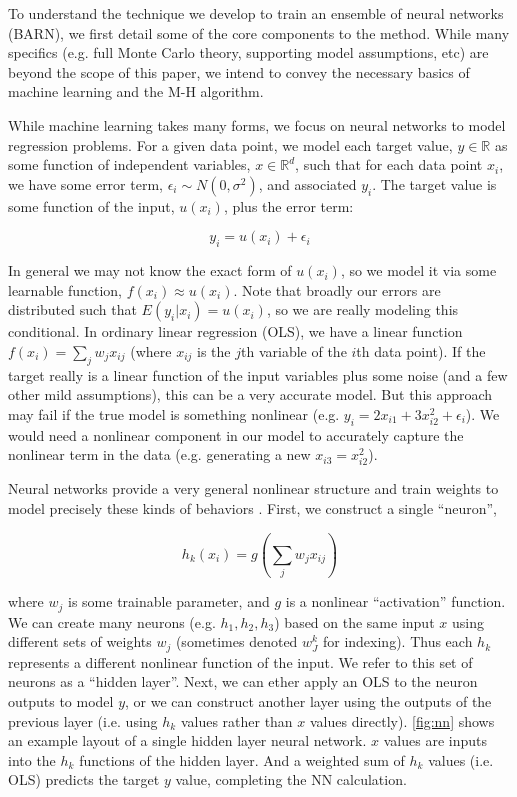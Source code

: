 \documentclass[12pt]{article}
\begin{document}

To understand the technique we develop to train an ensemble of neural networks (BARN), we first detail some of the core components to the method.  While many specifics (e.g. full Monte Carlo theory, supporting model assumptions, etc) are beyond the scope of this paper, we intend to convey the necessary basics of machine learning and the M-H algorithm.

While machine learning takes many forms, we focus on neural networks to model regression problems.  For a given data point, we model each target value, $y \in \mathbb{R}$ as some function of independent variables, $x \in \mathbb{R}^d$, such that for each data point $x_i$, we have some error term, $\epsilon_i \sim N(0,\sigma^2)$, and associated $y_i$.  The target value is some function of the input, $u(x_i)$, plus the error term:

$$
y_i = u(x_i) + \epsilon_i
$$

In general we may not know the exact form of $u(x_i)$, so we model it via some learnable function, $f(x_i) \approx u(x_i)$.  Note that broadly our errors are distributed such that $E(y_i|x_i) = u(x_i)$, so we are really modeling this conditional.  In ordinary linear regression (OLS), we have a linear function $f(x_i) = \sum_j w_j x_{ij}$ (where $x_{ij}$ is the $j$th variable of the $i$th data point).  If the target really is a linear function of the input variables plus some noise (and a few other mild assumptions), this can be a very accurate model.  But this approach may fail if the true model is something nonlinear (e.g. $y_i = 2x_{i1} + 3x_{i2}^2 + \epsilon_i$).  We would need a nonlinear component in our model to accurately capture the nonlinear term in the data (e.g. generating a new $x_{i3} =x_{i2}^2$).

Neural networks provide a very general nonlinear structure and train weights to model precisely these kinds of behaviors \cite{hastie2009elements}.  First, we construct a single ``neuron'',

$$
h_k(x_i) = g(\sum_j w_j x_{ij})
$$

where $w_j$ is some trainable parameter, and $g$ is a nonlinear ``activation'' function.  We can create many neurons (e.g. $h_1, h_2, h_3$) based on the same input $x$ using different sets of weights $w_j$ (sometimes denoted $w_J^k$ for indexing).  Thus each $h_k$ represents a different nonlinear function of the input.  We refer to this set of neurons as a ``hidden layer''.  Next, we can ether apply an OLS to the neuron outputs to model $y$, or we can construct another layer using the outputs of the previous layer (i.e. using $h_k$ values rather than $x$ values directly).  \autoref{fig:nn} shows an example layout of a single hidden layer neural network.  $x$ values are inputs into the $h_k$ functions of the hidden layer.  And a weighted sum of $h_k$ values  (i.e. OLS) predicts the target $y$ value, completing the NN calculation.
\end{document}
